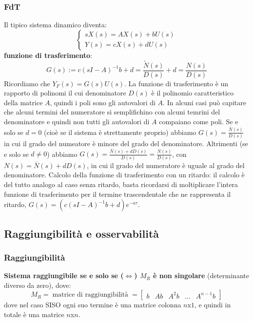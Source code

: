 \begin{landscape}
    \subsubsection*{FdT}
    Il tipico sistema dinamico diventa:
    \[
        \begin{cases}
            s X(s) = AX(s) + b U(s)\\
            Y(s) = cX(s) + d U(s)
        \end{cases}
    \]
    \textbf{funzione di trasferimento}:
    \[
        G(s) := c(sI-A)^{-1} b + d = \frac{\tilde{N}(s)}{D(s)} + d = \frac{N(s)}{D(s)}
    \]
    Ricordiamo che $Y_F(s) = G(s) U(s)$.\newline
    \newline
    La funzione di trasferimento è un rapporto di polinomi il cui denominatore $D(s)$ è il polinomio caratteristico della matrice $A$, quindi i poli sono gli autovalori di $A$. In alcuni casi può capitare che alcuni termini del numeratore si semplifichino con alcuni temrini del denominatore e quindi non tutti gli autovalori di $A$ compaiano come poli.\newline
    Se e solo se $d=0$ (cioè se il sistema è strettamente proprio) abbiamo $G(s) = \frac{\bar{N}(s)}{D(s)}$ in cui il grado del numeatore è minore del grado del denominatore.\newline
    Altrimenti (se e solo se $d\neq 0$) abbiamo $G(s) = \frac{\bar{N}(s) + dD(s)}{D(s)} = \frac{N(s)}{D(s)}$, con $N(s) = \bar{N}(s) +dD(s)$, in cui il grado del numeratore è uguale al grado del denominatore.\newline
    \newline
    Calcolo della funzione di trasferimento con un ritardo: il calcolo è del tutto analogo al caso senza ritardo, basta ricordarsi di moltiplicare l'intera funzione di trasferimento per il termine trascendentale che ne rappresenta il ritardo, $G(s) = (c(sI-A)^{-1} b + d) e^{-a \tau}$.
    \subsection*{Raggiungibilità e osservabilità}
    \subsubsection*{Raggiungibilità}
    \textbf{Sistema raggiungibile se e solo se ($\Leftrightarrow$) $M_R$ è non singolare} (determinante diverso da zero), dove:
    \[
        M_R= \;\text{matrice di raggiungibilità}\; =\left[\begin{matrix}
            b & Ab & A^2 b & \dots & A^{n-1}b
        \end{matrix}\right]
    \] 
    dove nel caso SISO ogni suo termine è una matrice colonna $n$x$1$, e quindi in totale è una matrice $n$x$n$.

\end{landscape}
